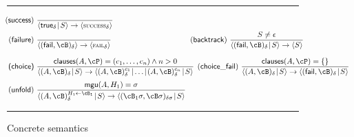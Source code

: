 \documentclass[fleqn]{tlp}
\newcommand{\mgu}{\mathsf{mgu}}
\newcommand{\fail}{\mathsf{fail}}
\newcommand{\clauses}{\mathsf{clauses}}
\newcommand{\midd}{\!\mid\!}
\newcommand{\success}{\mbox{\footnotesize \textsc{success}}}
\newcommand{\failsc}{\mbox{\footnotesize \textsc{fail}}}
\def \tuple#1{\langle #1 \rangle}
\begin{document}
\begin{figure}[t]
  \rule{\linewidth}{1pt}
  \[
  \hspace{-2ex}\begin{array}{r@{~}l}
    \mathsf{(success)} & {\displaystyle 
      \frac{~} 
        {\tuple{\mathsf{true}_\delta\midd S} \to \tuple{\success_\delta}}
        } 
        \\[2ex]

     \mathsf{(failure)} & {\displaystyle 
      \frac{~} 
        {\tuple{(\fail,\cB)_\delta} \to \tuple{\failsc_\delta}}
        }
        \hspace{24ex}
    \mathsf{(backtrack)} ~ {\displaystyle 
      \frac{S\neq\epsilon} 
        {\tuple{(\fail,\cB)_\delta\midd S} \to \tuple{S}}
        }\\[4ex]

     \textsf{(choice)} &  {\displaystyle 
      \frac{\clauses(A,\cP) = (c_1,\ldots,c_n)\wedge n>0 } 
        {\tuple{(A,\cB)_\delta\midd S} \to
\tuple{(A,\cB)_\delta^{c_1} \midd \ldots\midd
          (A,\cB)_\delta^{c_n}\midd  S}}
        } \hfill\hspace{1ex}
    \mathsf{(choice\_fail)} ~ {\displaystyle 
      \frac{\clauses(A,\cP)=\emptyset} 
        {\tuple{(A,\cB)_\delta\midd S} \to \tuple{(\fail,\cB)_\delta\midd S}}
        }\\[3ex]

    \mathsf{(unfold)} & {\displaystyle 
      \frac{\mgu(A,H_1)=\sigma} 
        {\tuple{(A,\cB)_\delta^{H_1\leftarrow\cB_1}\midd S}
          \to \tuple{(\cB_1\sigma,\cB\sigma)_{\delta\sigma}\midd S}}
        } \\ 

    \end{array}
    \]
  \rule{\linewidth}{1pt}
  \caption{Concrete semantics} 
  \label{fig:concrete2}
\end{figure}
\end{document}
